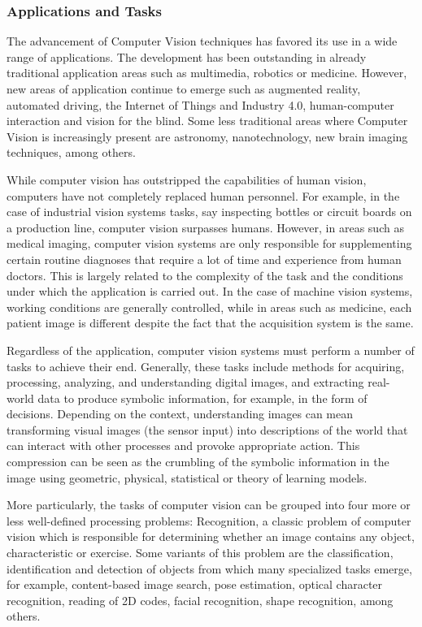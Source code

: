 \subsubsection{Applications and Tasks}

The advancement of Computer Vision techniques has favored its use in a wide range of applications. The development has been outstanding in already traditional application areas such as multimedia, robotics or medicine. However, new areas of application continue to emerge such as augmented reality, automated driving, the Internet of Things and Industry 4.0, human-computer interaction and vision for the blind. Some less traditional areas where Computer Vision is increasingly present are astronomy, nanotechnology, new brain imaging techniques, among others.

While computer vision has outstripped the capabilities of human vision, computers have not completely replaced human personnel. For example, in the case of industrial vision systems tasks, say inspecting bottles or circuit boards on a production line, computer vision surpasses humans. However, in areas such as medical imaging, computer vision systems are only responsible for supplementing certain routine diagnoses that require a lot of time and experience from human doctors. This is largely related to the complexity of the task and the conditions under which the application is carried out. In the case of machine vision systems, working conditions are generally controlled, while in areas such as medicine, each patient image is different despite the fact that the acquisition system is the same.

Regardless of the application, computer vision systems must perform a number of tasks to achieve their end. Generally, these tasks include methods for acquiring, processing, analyzing, and understanding digital images, and extracting real-world data to produce symbolic information, for example, in the form of decisions. Depending on the context, understanding images can mean transforming visual images (the sensor input) into descriptions of the world that can interact with other processes and provoke appropriate action. This compression can be seen as the crumbling of the symbolic information in the image using geometric, physical, statistical or theory of learning models.

More particularly, the tasks of computer vision can be grouped into four more or less well-defined processing problems: Recognition, a classic problem of computer vision which is responsible for determining whether an image contains any object, characteristic or exercise. Some variants of this problem are the classification, identification and detection of objects from which many specialized tasks emerge, for example, content-based image search, pose estimation, optical character recognition, reading of 2D codes, facial recognition, shape recognition, among others.

